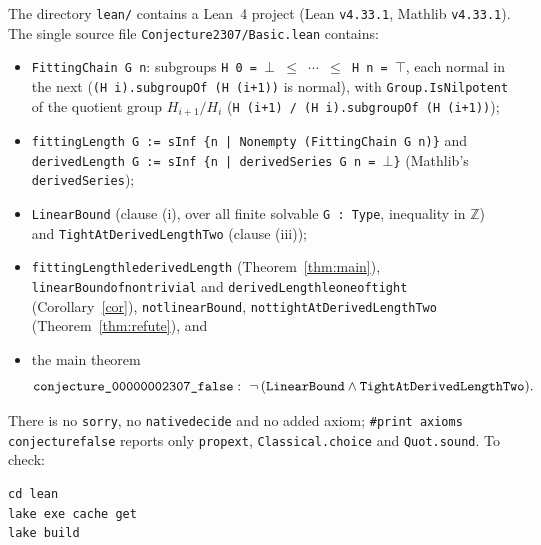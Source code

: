 \documentclass[11pt]{article}
\theoremstyle{definition}
\theoremstyle{remark}
\renewcommand{\_}{\oldus\allowbreak}
\begin{document}
The directory \texttt{lean/} contains a Lean~4 project (Lean \texttt{v4.33.1}, Mathlib \texttt{v4.33.1}).
The single source file \texttt{Conjecture2307/Basic.lean} contains:

\begin{itemize}
  \item \texttt{FittingChain G n}: subgroups \texttt{H 0 = $\bot$ $\le$ $\cdots$ $\le$ H n = $\top$}, each
        normal in the next (\texttt{(H i).subgroupOf (H (i+1))} is normal), with
        \texttt{Group.IsNilpotent} of the quotient group $H_{i+1}/H_i$ (\texttt{H (i+1) / (H i).subgroupOf (H (i+1))});
  \item \texttt{fittingLength G := sInf \{n | Nonempty (FittingChain G n)\}} and
        \texttt{derivedLength G := sInf \{n | derivedSeries G n = $\bot$\}} (Mathlib's
        \texttt{derivedSeries});
  \item \texttt{LinearBound} (clause (i), over all finite solvable \texttt{G : Type}, inequality in
        $\mathbb Z$) and \texttt{TightAtDerivedLengthTwo} (clause (iii));
  \item \texttt{fittingLength\_le\_derivedLength} (Theorem~\ref{thm:main}),
        \texttt{linearBound\_of\_nontrivial} and \texttt{derivedLength\_le\_one\_of\_tight}
        (Corollary~\ref{cor}),
        \texttt{not\_linearBound}, \texttt{not\_tightAtDerivedLengthTwo} (Theorem~\ref{thm:refute}), and
  \item the main theorem
\[
  \texttt{conjecture\_00000002307\_false} :\ \neg\,(\texttt{LinearBound} \wedge \texttt{TightAtDerivedLengthTwo}).
\]
\end{itemize}

There is no \texttt{sorry}, no \texttt{native\_decide} and no added axiom;
\texttt{\#print axioms conjecture\_00000002307\_false} reports only \texttt{propext},
\texttt{Classical.choice} and \texttt{Quot.sound}. To check:
\begin{verbatim}
cd lean
lake exe cache get
lake build
\end{verbatim}
\end{document}
